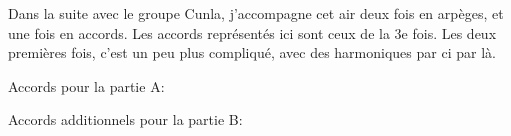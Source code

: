 Dans la suite avec le groupe Cunla, j'accompagne cet air deux fois en arpèges,
et une fois en accords. Les accords représentés ici sont ceux de la 3e
fois. Les deux premières fois, c'est un peu plus compliqué, avec des
harmoniques par ci par là.

Accords pour la partie A:


Accords additionnels pour la partie B:


\tune
